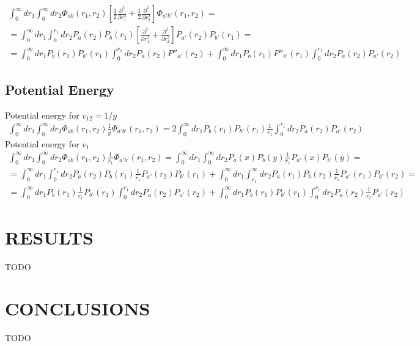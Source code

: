 \documentclass[aip
, pra
, showpacs
, aps
, onecolumn
, groupedaddress
, floatfix
]{revtex4}
\newcommand{\beq}{\begin{equation}}
\newcommand{\eeq}{\end{equation}}
\newcommand{\barr}{\begin{array}}
\newcommand{\earr}{\end{array}}
\begin{document}
\beq \barr{l}
\int_0^\infty dr_1 \int_0^\infty dr_2 \Phi_{ab}(r_1, r_2)
[\frac{1}{2}\frac{\partial^2}{\partial r_1^2} + \frac{1}{2} \frac{\partial^2}{\partial r_2^2}]\Phi_{a'b'}(r_1, r_2)
=\\
=\int_0^\infty dr_1  \int_0^{r_1} dr_2 P_a(r_2) P_b(r_1)
[\frac{\partial^2}{\partial r_1^2} + \frac{\partial^2}{\partial r_2^2} ]
P_{a'}(r_2) P_{b'}(r_1)=\\
=\int_0^\infty dr_1  P_b(r_1) P_{b'}(r_1) \int_0^{r_1} dr_2 P_a(r_2) P''_{a'}(r_2)
+\int_0^\infty dr_1  P_b(r_1) P''_{b'}(r_1) \int_0^{r_1} dr_2 P_a(r_2) P_{a'}(r_2)
\earr \eeq

\subsection{Potential Energy}
Potential energy for $v_{12}=1/y$
\beq \barr{l}
\int_0^\infty dr_1 \int_0^\infty dr_2 \Phi_{ab}(r_1, r_2) \frac{1}{y} \Phi_{a'b'}(r_1, r_2)
= 2 \int_0^\infty dr_1  P_b(r_1) P_{b'}(r_1) \frac{1}{r_1} \int_0^{r_1} dr_2 P_a(r_2) P_{a'}(r_2)
\earr \eeq
Potential energy for $v_{1}$
\beq \barr{l}
\int_0^\infty dr_1 \int_0^\infty dr_2 \Phi_{ab}(r_1, r_2) \frac{1}{r_1} \Phi_{a'b'}(r_1, r_2)
=\int_0^\infty dr_1 \int_0^\infty dr_2 P_a(x) P_b(y) \frac{1}{r_1} P_{a'}(x) P_{b'}(y)=\\
= \int_0^\infty dr_1  \int_0^{r_1} dr_2 P_a(r_2) P_b(r_1) \frac{1}{r_1} P_{a'}(r_2) P_{b'}(r_1)
+\int_0^\infty dr_1  \int_{r_1}^\infty dr_2 P_a(r_1) P_b(r_2) \frac{1}{r_1} P_{a'}(r_1) P_{b'}(r_2)  =\\
= \int_0^\infty dr_1  P_b(r_1) \frac{1}{r_1} P_{b'}(r_1) \int_0^{r_1} dr_2 P_a(r_2) P_{a'}(r_2)
+ \int_0^\infty dr_1  P_b(r_1) P_{b'}(r_1) \int_0^{r_1} dr_2 P_a(r_2) \frac{1}{r_2} P_{a'}(r_2)
\earr \eeq


\section{RESULTS}
TODO
\section{CONCLUSIONS}
TODO


\begin{acknowledgments}
\end{acknowledgments}





%
\end{document}
